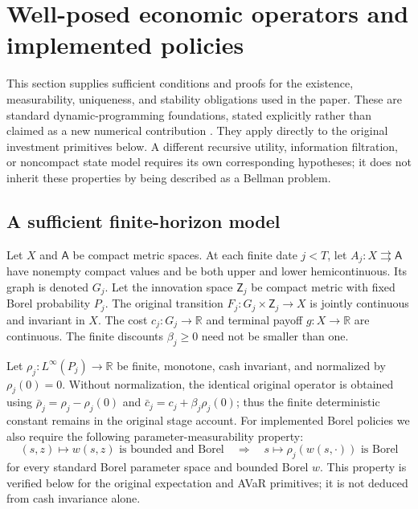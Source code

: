 \section{Well-posed economic operators and implemented policies}
\label{supp:foundations119}
This section supplies sufficient conditions and proofs for the existence,
measurability, uniqueness, and stability obligations used in the paper.
These are standard dynamic-programming foundations, stated explicitly
rather than claimed as a new numerical contribution
\citep{ruszczynski2010risk,ruszczynski2014erratum}.  They apply directly
to the original investment primitives below.  A different recursive
utility, information filtration, or noncompact state model requires its
own corresponding hypotheses; it does not inherit these properties by
being described as a Bellman problem.

\subsection{A sufficient finite-horizon model}
Let $X$ and $\mathsf A$ be compact metric spaces.  At each finite date
$j<T$, let $A_j:X\rightrightarrows\mathsf A$ have nonempty compact
values and be both upper and lower hemicontinuous.  Its graph is denoted
$G_j$.  Let the innovation space $\mathsf Z_j$ be compact metric with
fixed Borel probability $P_j$.  The original transition
$F_j:G_j\times\mathsf Z_j\to X$ is jointly continuous and invariant
in $X$.  The cost $c_j:G_j\to\mathbb R$ and terminal payoff
$g:X\to\mathbb R$ are continuous.  The finite discounts
$\beta_j\ge0$ need not be smaller than one.

Let $\rho_j:L^\infty(P_j)\to\mathbb R$ be finite, monotone, cash
invariant, and normalized by $\rho_j(0)=0$.  Without normalization,
the identical original operator is obtained using
$\bar\rho_j=\rho_j-\rho_j(0)$ and
$\bar c_j=c_j+\beta_j\rho_j(0)$; thus the finite deterministic
constant remains in the original stage account.  For implemented Borel policies we also
require the following parameter-measurability property:
\begin{equation}\label{eq:kernelmeas119}
 (s,z)\mapsto w(s,z)\text{ is bounded and Borel}\quad\Longrightarrow
 \quad s\mapsto\rho_j(w(s,\cdot))\text{ is Borel}
\end{equation}
for every standard Borel parameter space and bounded Borel $w$.
This property is verified below for the original expectation and AVaR
primitives; it is not deduced from cash invariance alone.

